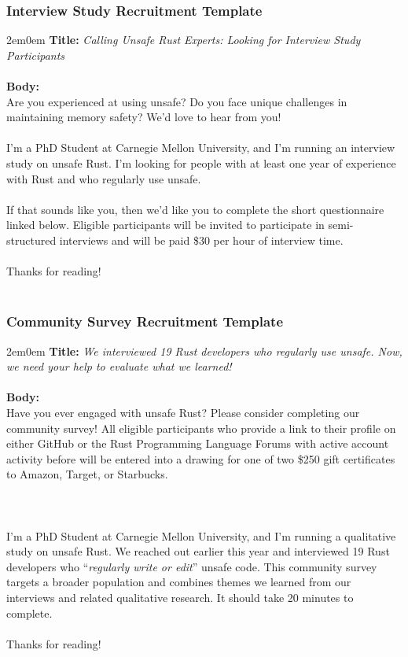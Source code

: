 \subsubsection{Interview Study Recruitment Template}
\begin{adjustwidth}{2em}{0em}
\textbf{Title:} \textit{Calling Unsafe Rust Experts: Looking for Interview Study Participants}
\\\\
\textbf{Body:}\\
Are you experienced at using unsafe? Do you face unique challenges in maintaining memory
safety? We’d love to hear from you!
\\\\
I’m a PhD Student at Carnegie Mellon University, and I’m running an interview study on unsafe
Rust. I’m looking for people with at least one year of experience with Rust and who regularly
use unsafe.
\\\\
If that sounds like you, then we’d like you to complete the short questionnaire linked below.
Eligible participants will be invited to participate in semi-structured interviews and will be paid
\$30 per hour of interview time.
\\\\
Thanks for reading!
\\\\
\end{adjustwidth}
\subsubsection{Community Survey Recruitment Template}
\begin{adjustwidth}{2em}{0em}
\textbf{Title:} \textit{We interviewed 19 Rust developers who regularly use unsafe. Now, we need your help to
evaluate what we learned!}
\\\\
\textbf{Body:}\\
Have you ever engaged with unsafe Rust? Please consider completing our community survey!
All eligible participants who provide a link to their profile on either GitHub or the Rust
Programming Language Forums with active account activity before  will be
entered into a drawing for one of two \$250 gift certificates to Amazon, Target, or Starbucks.
\\\\
\\\\
I’m a PhD Student at Carnegie Mellon University, and I’m running a qualitative study on unsafe
Rust. We reached out earlier this year  and interviewed 19 Rust
developers who ``\textit{regularly write or edit}'' unsafe code. This community survey targets a broader
population and combines themes we learned from our interviews and related qualitative
research. It should take 20 minutes to complete.
\\\\
Thanks for reading!
\\\\
\end{adjustwidth}